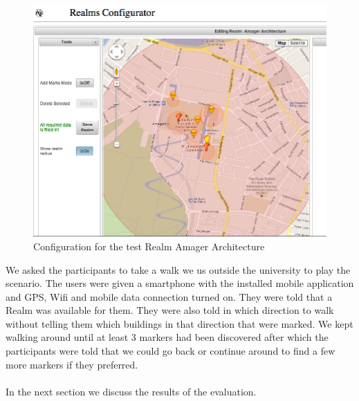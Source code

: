 \begin{figure}[ht]
	\centering
	\includegraphics[scale=0.5]{fig/amager_configuration}
	\caption{Configuration for the test Realm Amager Architecture}
	\label{fig.amager.arc}
\end{figure}

\noinden We asked the participants to take a walk we us outside the university to play the scenario. The users were given a smartphone with the installed mobile application and GPS, Wifi and mobile data connection turned on. They were told that a Realm was available for them. They were also told in which direction to walk without telling them which buildings in that direction that were marked. We kept walking around until at least 3 markers had been discovered after which the participants were told that we could go back or continue around to find a few more markers if they preferred.
\\\\
In the next section we discuss the results of the evaluation.

